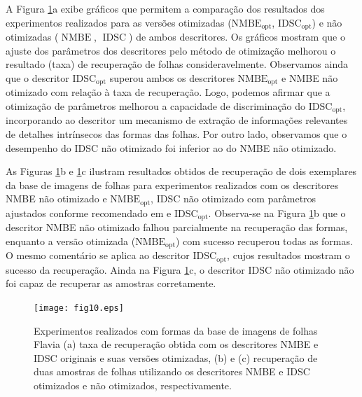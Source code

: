 A Figura \ref{fig1Ooptimization_graph}a exibe gráficos que permitem a comparação dos resultados dos experimentos realizados para as versões otimizadas ($\operatorname{NMBE_{opt}}$, $\operatorname{IDSC_{opt}}$)
 e não otimizadas ($\operatorname{NMBE}$, $\operatorname{IDSC}$) de ambos descritores. Os gráficos mostram que o ajuste dos parâmetros dos descritores pelo método de otimização melhorou o resultado (taxa) de recuperação de folhas consideravelmente. Observamos ainda que o descritor $\operatorname{IDSC_{opt}}$ superou ambos os descritores $\operatorname{NMBE_{opt}}$ e NMBE não otimizado com relação à taxa de recuperação. Logo, podemos afirmar que a otimização de parâmetros melhorou a capacidade de discriminação do  $\operatorname{IDSC_{opt}}$, incorporando ao descritor um mecanismo de extração de informações relevantes de detalhes intrínsecos das formas das folhas. Por outro lado, observamos que o desempenho do IDSC não otimizado foi inferior ao do NMBE não otimizado. 

As Figuras \ref{fig1Ooptimization_graph}b e \ref{fig1Ooptimization_graph}c ilustram resultados obtidos de recuperação de dois exemplares da base de imagens de folhas para experimentos realizados com os descritores NMBE não otimizado e $\operatorname{NMBE_{opt}}$,  IDSC não otimizado com parâmetros ajustados conforme recomendado em \cite{wang2015march} e $\operatorname{IDSC_{opt}}$. Observa-se na Figura \ref{fig1Ooptimization_graph}b que o descritor NMBE não otimizado falhou parcialmente na recuperação das formas, enquanto a versão otimizada ($\operatorname{NMBE_{opt}}$) com sucesso recuperou todas as formas. O mesmo comentário se aplica ao descritor $\operatorname{IDSC_{opt}}$, cujos resultados mostram o sucesso da recuperação. Ainda na Figura \ref{fig1Ooptimization_graph}c, o descritor IDSC não otimizado não foi capaz de recuperar as amostras corretamente.

\begin{figure}[]
\caption{Experimentos realizados com formas da base de imagens de folhas Flavia (a) taxa de recuperação  obtida com os descritores NMBE e IDSC originais e suas versões otimizadas, (b) e (c) recuperação de duas amostras de folhas utilizando os descritores NMBE e IDSC otimizados e não otimizados, respectivamente.\label{fig1Ooptimization_graph}}
\texttt{[image: fig10.eps]}
\end{figure}

